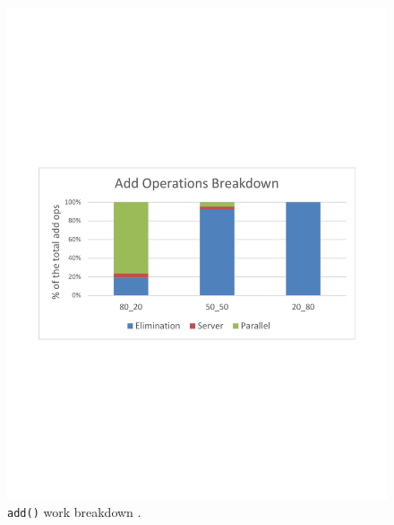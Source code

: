 \begin{figure}[htb]
	\centering
	\begin{minipage}[b]{.495\textwidth}
		\centering
		\includegraphics[width=\linewidth]{graphics/sparc-add-brk.pdf}
		\caption{\texttt{add()} work breakdown \cite{calciu_adaptive_2014}.}
		\label{fig:sparc_add}
	\end{minipage}
	\hfill%
	\begin{minipage}[b]{.495\textwidth}
		\centering

\end{minipage}
\end{figure}
